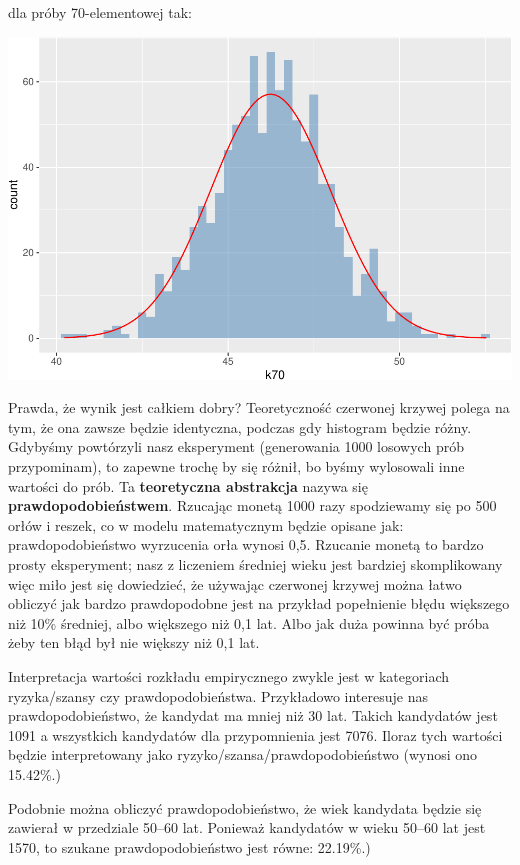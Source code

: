 \documentclass[
  openany]{book}
\begin{document}
dla próby 70-elementowej tak:

\includegraphics{_main_files/figure-latex/unnamed-chunk-36-1.pdf}

Prawda, że wynik jest całkiem dobry? Teoretyczność czerwonej krzywej
polega na tym, że ona zawsze będzie identyczna, podczas gdy histogram będzie różny.
Gdybyśmy powtórzyli nasz
eksperyment (generowania 1000 losowych prób przypominam),
to zapewne trochę by się różnił, bo byśmy wylosowali inne wartości do prób.
Ta \textbf{teoretyczna abstrakcja} nazywa się
\textbf{prawdopodobieństwem}. Rzucając monetą 1000 razy spodziewamy
się po 500 orłów i reszek,
co w modelu matematycznym będzie opisane jak:
prawdopodobieństwo wyrzucenia orła wynosi 0,5.
Rzucanie monetą to bardzo prosty eksperyment; nasz z liczeniem średniej
wieku jest bardziej skomplikowany więc miło jest się
dowiedzieć, że używając czerwonej krzywej można łatwo obliczyć jak bardzo
prawdopodobne jest na przykład popełnienie błędu większego niż 10\% średniej, albo
większego niż 0,1 lat. Albo jak duża powinna być próba żeby ten
błąd był nie większy niż 0,1 lat.

Interpretacja wartości rozkładu empirycznego zwykle jest w kategoriach ryzyka/szansy czy
prawdopodobieństwa. Przykładowo interesuje nas prawdopodobieństwo, że kandydat ma
mniej niż 30 lat.
Takich kandydatów jest 1091
a wszystkich kandydatów dla przypomnienia
jest 7076. Iloraz tych wartości będzie interpretowany
jako ryzyko/szansa/prawdopodobieństwo
(wynosi ono 15.42\%.)

Podobnie można obliczyć prawdopodobieństwo, że wiek kandydata będzie się
zawierał w przedziale 50--60 lat.
Ponieważ kandydatów w wieku 50--60 lat jest 1570,
to szukane prawdopodobieństwo
jest równe: 22.19\%.)
\end{document}
